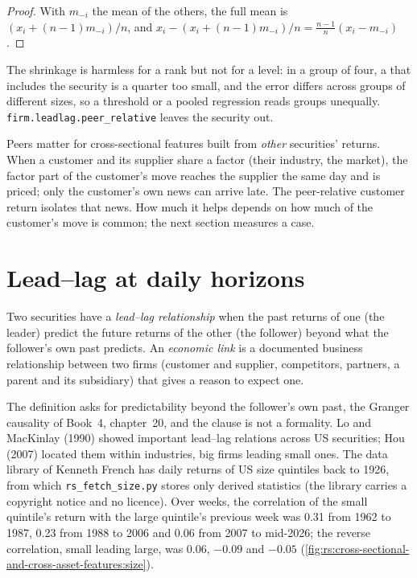 \begin{proof}
With $m_{-i}$ the mean of the others, the full mean is $(x_i + (n-1)m_{-i})/n$, and $x_i - (x_i + (n-1)m_{-i})/n =
\frac{n-1}{n}(x_i - m_{-i})$.
\end{proof}

The shrinkage is harmless for a rank but not for a level: in a group of four, a  that includes the
security is a quarter too small, and the error differs across groups of different sizes, so a threshold or a pooled regression
reads groups unequally. \texttt{firm.leadlag.peer\_relative} leaves the security out.

Peers matter for cross-sectional features built from \emph{other} securities' returns. When a customer and its supplier share a
factor (their industry, the market), the factor part of the customer's move reaches the supplier the same day and is priced;
only the customer's own news can arrive late. The peer-relative customer return isolates that news. How much it helps depends on
how much of the customer's move is common; the next section measures a case.

\section{Lead--lag at daily horizons}

\begin{definition}\label{def:rs:cross-sectional-and-cross-asset-features:leadlag}
Two securities have a \emph{lead--lag relationship} when the past returns of one (the leader)
predict the future returns of the other (the follower) beyond what the follower's own past predicts. An \emph{economic
link} is a documented business relationship between two firms (customer and supplier, competitors,
partners, a parent and its subsidiary) that gives a reason to expect one.
\end{definition}

The definition asks for predictability beyond the follower's own past, the Granger causality of Book~4, chapter~20, and the
clause is not a formality. Lo and MacKinlay (1990) showed important lead--lag relations across US securities;
Hou (2007) located them within industries, big firms leading small ones. The data library of Kenneth French has daily returns of
US size quintiles back to 1926, from which \texttt{rs\_fetch\_size.py} stores only derived statistics (the library carries a
copyright notice and no licence). Over weeks, the correlation of the small quintile's return with the large quintile's previous
week was 0.31 from 1962 to 1987, 0.23 from 1988 to 2006 and 0.06 from 2007 to mid-2026; the reverse correlation, small leading
large, was 0.06, $-0.09$ and $-0.05$ (\cref{fig:rs:cross-sectional-and-cross-asset-features:size}).

